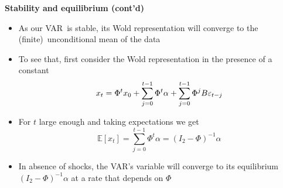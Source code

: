\begin{frame}
{\textbf{Stability and equilibrium (cont'd)}}

\begin{itemize}
\item As our VAR\ is stable, its Wold representation will converge to the
(finite)\ unconditional mean of the data\bigskip

\item To see that, first consider the Wold representation in the presence of
a constant%
\begin{equation*}
x_{t}={\Phi ^{t}x_{0}+\sum\limits_{j=0}^{t-1}\Phi ^{t}\alpha }+{%
\sum\limits_{j=0}^{t-1}\Phi ^{j}B{\varepsilon _{t-j}}}
\end{equation*}
\vspace{-.1cm}

\item For $t$ large enough and taking expectations we get 
\begin{equation*}
\mathbb{E}\left[ x_{t}\right] ={\sum\limits_{j=0}^{t-1}\Phi ^{t}\alpha =}%
\left( I_{2}-\Phi \right) ^{-1}\alpha
\end{equation*}
\vspace{-.1cm}

\item In absence of shocks, the VAR's variable will converge to its
equilibrium $\left( I_{2}-\Phi \right) ^{-1}\alpha $ at a rate that depends
on $\Phi $
\end{itemize}
\end{frame}


